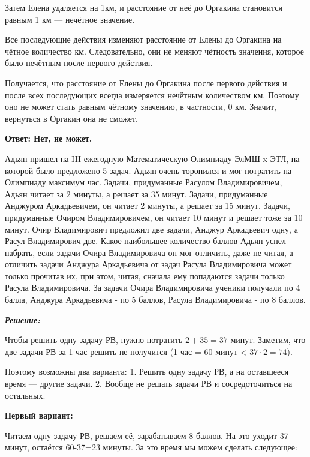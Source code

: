 Затем Елена удаляется на 1км, и расстояние от неё до Оргакина становится равным 1 км — нечётное значение.

Все последующие действия изменяют расстояние от Елены до Оргакина на чётное количество км. Следовательно, они не меняют чётность значения, которое было нечётным после первого действия.

Получается, что расстояние от Елены до Оргакина после первого действия и после всех последующих всегда измеряется нечётным количеством км. Поэтому оно не может стать равным чётному значению, в частности, 0 км. Значит, вернуться в Оргакин она не сможет.

\textbf{Ответ: Нет, не может.}


\hspace{3mm}

 Адьян пришел на III ежегодную Математическую Олимпиаду ЭлМШ x ЭТЛ, на которой было предложено 5 задач. Адьян очень торопился и мог потратить на Олимпиаду максимум час. Задачи, придуманные Расулом Владимировичем, Адьян читает за 2 минуты, а решает за 35 минут. Задачи, придуманные Анджуром Аркадьевичем, он читает 2 минуты, а решает за 15 минут. Задачи, придуманные Очиром Владимировичем, он читает 10 минут и решает тоже за 10 минут. Очир Владимирович предложил две задачи, Анджур Аркадьевич одну, а Расул Владимирович две. Какое наибольшее количество баллов Адьян успел набрать, если задачи Очира Владимировича он мог отличить, даже не читая, а отличить задачи Анджура Аркадьевича от задач Расула Владимировича может только прочитав их, при этом, читая, сначала ему попадаются задачи только Расула Владимировича. За задачи Очира Владимировича ученики получали по 4 балла, Анджура Аркадьевича - по 5 баллов, Расула Владимировича - по 8 баллов.

\newpage
\hspace{3mm}


\centerline{\textbf{\textit{Решение:}}}

Чтобы решить одну задачу РВ, нужно потратить $2+35=37$ минут. Заметим, что две задачи РВ за 1 час решить не получится (1 час = 60 минут < $37\cdot2=74$). 

Поэтому возможны два варианта: 
1. Решить одну задачу РВ, а на оставшееся время — другие задачи.
2. Вообще не решать задачи РВ и сосредоточиться на остальных.

\textbf{Первый вариант:}

Читаем одну задачу РВ, решаем её, зарабатываем 8 баллов. На это уходит 37 минут, остаётся 60-37=23 минуты. За это время мы можем сделать следующее:

